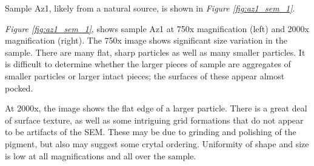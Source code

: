 
Sample Az1, likely from a natural source, is shown in \textit{Figure \ref{fig:az1_sem_1}}. 

\textit{Figure \ref{fig:az1_sem_1}}, shows sample Az1 at 750x magnification (left) and 2000x magnification (right). The 750x image shows significant size variation in the sample. There are many flat, sharp particles as well as many smaller particles. It is difficult to determine whether the larger pieces of sample are aggregates of smaller particles or larger intact pieces; the surfaces of these appear almost pocked.

At 2000x, the image shows the flat edge of a larger particle. There is a great deal of surface texture, as well as some intriguing grid formations that do not appear to be artifacts of the SEM. These may be due to grinding and polishing of the pigment, but also may suggest some crytal ordering. Uniformity of shape and size is low at all magnifications and all over the sample.

